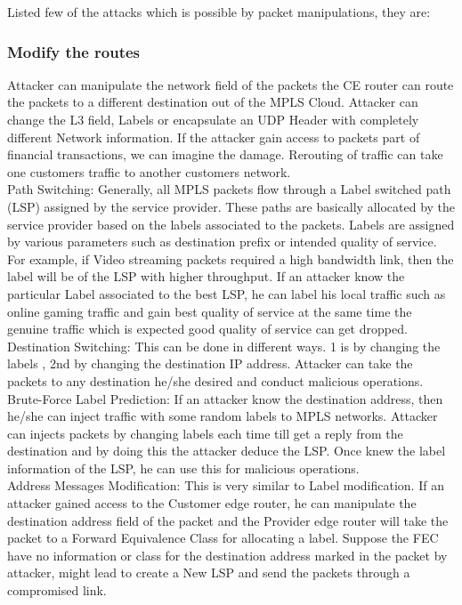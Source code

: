 Listed few of the attacks which is possible by packet manipulations, they are: 

\subsubsection{Modify the routes}
 

Attacker can manipulate the network field of the packets the CE router can route the packets to a different destination out of the MPLS Cloud. Attacker can change the L3 field, Labels or encapsulate an UDP Header with completely different Network information. If the attacker gain access to packets part of financial transactions, we can imagine the damage. Rerouting of traffic can take one customers traffic to another customers network. \\

    Path Switching:   Generally, all MPLS packets flow through a Label switched path (LSP) assigned by the service provider. These paths are basically allocated by the service provider based on the labels associated to the packets. Labels are assigned by various parameters such as destination prefix or intended quality of service. For example, if Video streaming packets required a high bandwidth link, then the label will be of the LSP with higher throughput. If an attacker know the particular Label associated to the best LSP, he can label his local traffic such as online gaming traffic and gain best quality of service at the same time the genuine traffic which is expected good quality of service can get dropped. \\
    
    Destination Switching: This can be done in different ways. 1 is by changing the labels , 2nd by changing the destination IP address. Attacker can take the packets to any destination he/she desired and conduct malicious operations. \\
    
    Brute-Force Label Prediction: If an attacker know the destination address, then he/she can inject traffic with some random labels to MPLS networks. Attacker can injects packets by changing labels each time till get a reply from the destination and by doing this the attacker deduce the LSP. Once knew the label information of the LSP, he can use this for malicious operations.\\
    
    
    Address Messages Modification: This is very similar to Label modification. If an attacker gained access to the Customer edge router, he can manipulate the destination address field of the packet and the Provider edge router will take the packet to a Forward Equivalence Class for allocating a label. Suppose the FEC have no information or class for the destination address marked in the packet by attacker, might lead to create a New LSP and send the packets through a compromised link.\\

